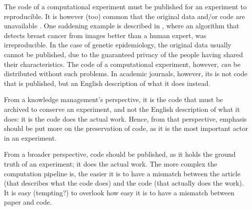 The code of a computational experiment must be published
for an experiment to reproducible.
It is however (too) common that the original data
and/or code are unavailable \cite{peng2021reproducible}.
One saddening example is described in \cite{haibe2020importance}, where
an algorithm that detects breast cancer from images better than a human expert,
was irreproducible.
In the case of genetic epidemiology, 
the original data usually cannot be published, 
due to the guaranteed privacy of the people having shared their characteristics.
The code of a computational experiment, however, \emph{can} be
distributed without such problems.
In academic journals, however, its is not code that is published, 
but an English description of what it does instead.

From a knowledge management's perspective,
it is the code that must be archived 
to conserve an experiment,
and not the
English description of what it does:
it is the code does the actual work.
Hence, from that perspective, emphasis should be
put more on the preservation of code, as it is the most important actor
in an experiment.


From a broader perspective, code should be published, as it holds the
ground truth of an experiment; it does the actual work.
The more complex the computation pipeline is, the easier it is
to have a mismatch between the article (that describes what the
code does) and the code (that actually does the work).
It is easy (tempting?) to overlook how easy it is to have a mismatch
between paper and code.

